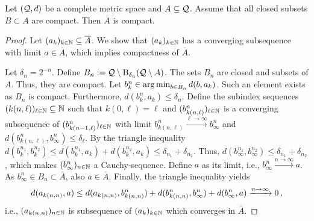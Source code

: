 \begin{lemma}\label{lmm:precompact}
Let $(\mathcal{Q}, d)$ be a complete metric space and $A\subseteq \mathcal{Q}$. Assume that all closed subsets $B\subset A$ are compact. Then $\overline A$ is compact.
\end{lemma}
\begin{proof}
	Let $(a_k)_{k\in\mathbb{N}}\subseteq \overline{A}$. We show that $(a_k)_{k\in\mathbb{N}}$ has a converging subsequence with limit $a \in \overline{A}$, which implies compactness of $\overline{A}$.
	
	Let $\delta_n = 2^{-n}$. Define $B_n := \mathcal{Q} \setminus \operatorname{\mathrm{B}}_{\delta_n}(\mathcal{Q} \setminus A)$. The sets $B_n$ are closed and subsets of $A$. Thus, they are compact. Let $b_k^n\in\operatorname*{arg\,min}_{b \in B_n} d(b, a_k)$. Such an element exists as $B_n$ is compact. Furthermore, $d(b_k^n, a_k) \leq \delta_n$. Define the subindex sequences $(k(n,\ell))_{\ell\in\mathbb{N}} \subseteq \mathbb{N}$ such that $k(0, \ell) = \ell$ and $(b^n_{k(n, \ell)})_{\ell\in\mathbb{N}}$ is a converging subsequence of $(b^n_{k(n-1, \ell)})_{\ell\in\mathbb{N}}$ with limit $b^n_{k(n, \ell)} \xrightarrow{\ell\to\infty}b^n_\infty$ and $d(b^n_{k(n, \ell)}, b^n_\infty) \leq \delta_\ell$. By the triangle inequality $d(b^{n_1}_k, b^{n_2}_k) \leq d(b^{n_1}_k, a_k) + d(b^{n_2}_k, a_k) \leq \delta_{n_1}+\delta_{n_2}$. Thus, $d(b^{n_1}_\infty, b^{n_2}_\infty) \leq \delta_{n_1}+\delta_{n_2}$, which makes $(b^{n}_\infty)_{n\in\mathbb{N}}$ a Cauchy-sequence. Define $a$ as its limit, i.e., $b^{n}_\infty \xrightarrow{n\to\infty} a$. As $b^{n}_\infty\in B_n \subset\overline{A}$, also $a\in\overline{A}$. Finally, the triangle inequality yields
	\begin{equation*}
		d(a_{k(n, n)}, a) \leq d(a_{k(n, n)}, b^n_{k(n, n)}) + d(b^n_{k(n, n)}, b^{n}_\infty) + d(b^{n}_\infty, a) \xrightarrow{n\to\infty}0\, ,
	\end{equation*}
	i.e., $(a_{k(n, n)})_{n\in\mathbb{N}}$ is subsequence of $(a_k)_{k\in\mathbb{N}}$ which converges in $\overline{A}$.
\end{proof}